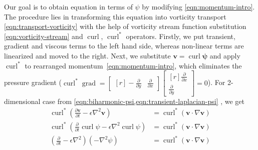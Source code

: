 \documentclass{article}
\numberwithin{equation}{section}
\begin{document}

Our goal is to obtain equation in terms of $\psi$ by modifying \cref{eqn:momentum-intro}. 
	The procedure lies in transforming this equation into vorticity transport \cref{eqn:transport-vorticity} with the help of vorticity stream function substitution \cref{eqn:vorticity-stream} and $\operatorname{curl}$, $\operatorname{curl}^*$ operators. 
	Firstly, we put transient, gradient and viscous terms to the left hand side, whereas non-linear terms are linearized and moved to the right. 
	Next, we substitute $\boldsymbol{v}=\operatorname{curl}\boldsymbol{\psi}$ and apply $\operatorname{curl}^*$ to rearranged momentum~\cref{eqn:momentum-intro}, which eliminates the pressure gradient ($\operatorname{curl}^*\operatorname{grad}=\begin{bmatrix*}[r]-\frac{\partial}{\partial y}&\frac{\partial}{\partial x}	\end{bmatrix*}\begin{bmatrix*}[r] \frac{\partial}{\partial x}\\ \frac{\partial}{\partial y} \end{bmatrix*}=0$). 
	For 2-dimensional case from \cref{eqn:biharmonic-psi,eqn:transient-laplacian-psi} , we get
	\begin{align}
		\operatorname{curl}^*\left( \frac{\partial \boldsymbol{v}}{\partial t} -\epsilon \nabla^2 \boldsymbol{v} \right)
			&=\operatorname{curl}^*\left( \boldsymbol{v}\cdot\nabla\boldsymbol{v}\right)\\
		\operatorname{curl}^*\left( \frac{\partial }{\partial t}\operatorname{curl}\psi -\epsilon \nabla^2 \operatorname{curl}\psi \right)
			&=\operatorname{curl}^*\left( \boldsymbol{v}\cdot\nabla\boldsymbol{v}\right)\\
		\left(\frac{\partial}{\partial t} -\epsilon \nabla^2\right)\left(-\nabla^2\psi\right)
			&=\operatorname{curl}^*\left( \boldsymbol{v}\cdot\nabla\boldsymbol{v}\right)\label{eqn:biharmonic-heat-eqn}
	\end{align}
	
\end{document}
